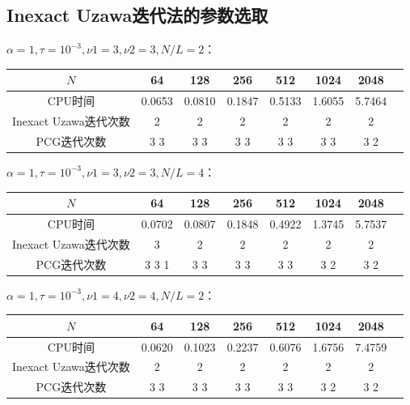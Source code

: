 \documentclass{article}
\begin{document}
\subsection{Inexact Uzawa迭代法的参数选取}

$\alpha = 1, \tau = 10^{-3}, \nu1 = 3, \nu2 = 3, N/L = 2$：
\newline
\begin{table}[!h]
  \centering
  \begin{tabular}{cccccccc}
    \toprule
    $N$ & 64 & 128 & 256 & 512 & 1024 & 2048  \\
    \midrule
    CPU时间 & 0.0653 & 0.0810 & 0.1847 & 0.5133 & 1.6055 & 5.7464  \\
    Inexact Uzawa迭代次数 & 2 & 2 & 2 & 2 & 2 & 2 \\
    PCG迭代次数 & 3 3 & 3 3 & 3 3 & 3 3 & 3 3 & 3 2 \\
    \bottomrule
  \end{tabular}
\end{table}

$\alpha = 1, \tau = 10^{-3}, \nu1 = 3, \nu2 = 3, N/L = 4$：

\begin{table}[!h]
  \centering
  \begin{tabular}{cccccccc}
    \toprule
    $N$ & 64 & 128 & 256 & 512 & 1024 & 2048  \\
    \midrule
    CPU时间 & 0.0702 & 0.0807 & 0.1848 & 0.4922 & 1.3745 & 5.7537  \\
    Inexact Uzawa迭代次数 & 3 & 2 & 2 & 2 & 2 & 2 \\
    PCG迭代次数 & 3 3 1 & 3 3 & 3 3 & 3 3 & 3 2 & 3 2 \\
    \bottomrule
  \end{tabular}
\end{table}

$\alpha = 1, \tau = 10^{-3}, \nu1 = 4, \nu2 = 4, N/L = 2$：
\begin{table}[!h]
  \centering
  \begin{tabular}{cccccccc}
    \toprule
    $N$ & 64 & 128 & 256 & 512 & 1024 & 2048  \\
    \midrule
    CPU时间 & 0.0620 & 0.1023 & 0.2237 & 0.6076 & 1.6756 & 7.4759  \\
    Inexact Uzawa迭代次数 & 2 & 2 & 2 & 2 & 2 & 2 \\
    PCG迭代次数 & 3 3 & 3 3 & 3 3 & 3 3 & 3 2 & 3 2 \\
    \bottomrule
  \end{tabular}
\end{table}
\end{document}
